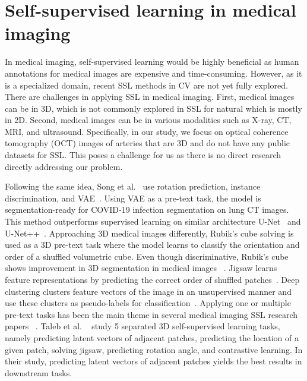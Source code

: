 \documentclass[a4paper,11pt,oneside]{report}
\begin{document}
\section{Self-supervised learning in medical imaging}
In medical imaging, self-supervised learning would be highly beneficial as human annotations for medical images are expensive and time-consuming. However, as it is a specialized domain, recent SSL methods in CV are not yet fully explored. There are challenges in applying SSL in medical imaging. First, medical images can be in 3D, which is not commonly explored in SSL for natural which is mostly in 2D. Second, medical images can be in various modalities such as X-ray, CT, MRI, and ultrasound. Specifically, in our study, we focus on optical coherence tomography (OCT) images of arteries that are 3D and do not have any public datasets for SSL. This poses a challenge for us as there is no direct research directly addressing our problem.

 Following the same idea, Song et al.~\cite{Song2022} use rotation prediction, instance discrimination, and VAE~\cite{Kingma2013}. Using VAE as a pre-text task, the model is segmentation-ready for COVID-19 infection segmentation on lung CT images. This method outperforms supervised learning on similar architecture U-Net~\cite{Ronneberger2015} and U-Net++~\cite{Zhou2020}. Approaching 3D medical images differently, Rubik's cube solving is used as a 3D pre-text task where the model learns to classify the orientation and order of a shuffled volumetric cube. Even though discriminative, Rubik's cube shows improvement in 3D segmentation in medical images ~\cite{Zhuang2019}. Jigsaw learns feature representations by predicting the correct order of shuffled patches~\cite{Noroozi2016}. Deep clustering clusters feature vectors of the image in an unsupervised manner and use these clusters as pseudo-labels for classification~\cite{Caron2018}. Applying one or multiple pre-text tasks has been the main theme in several medical imaging SSL research papers ~\cite{Zhou2021, Zhang2021, Dufumier2021}. Taleb et al. ~\cite{Taleb2020} study 5 separated 3D self-supervised learning tasks, namely predicting latent vectors of adjacent patches, predicting the location of a given patch, solving jigsaw, predicting rotation angle, and contrastive learning. In their study, predicting latent vectors of adjacent patches yields the best results in downstream tasks.
\end{document}
